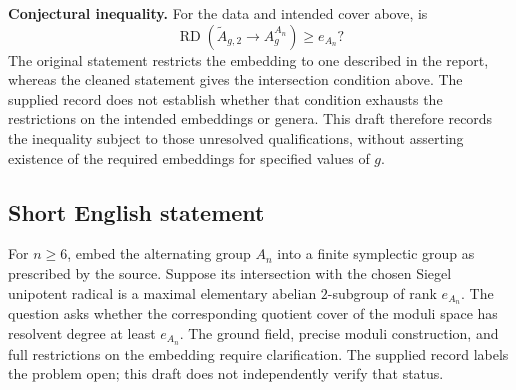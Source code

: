 \documentclass[11pt]{article}
\begin{document}
\textbf{Conjectural inequality.} For the data and intended cover above, is
\[
\operatorname{RD}\!\left(\widetilde A_{g,2}\longrightarrow A_g^{A_n}\right)\geq e_{A_n}?
\]
The original statement restricts the embedding to one described in the report, whereas the cleaned statement gives the intersection condition above. The supplied record does not establish whether that condition exhausts the restrictions on the intended embeddings or genera. This draft therefore records the inequality subject to those unresolved qualifications, without asserting existence of the required embeddings for specified values of \(g\).
\subsection{Short English statement}
For \(n\geq 6\), embed the alternating group \(A_n\) into a finite symplectic group as prescribed by the source. Suppose its intersection with the chosen Siegel unipotent radical is a maximal elementary abelian \(2\)-subgroup of rank \(e_{A_n}\). The question asks whether the corresponding quotient cover of the moduli space has resolvent degree at least \(e_{A_n}\). The ground field, precise moduli construction, and full restrictions on the embedding require clarification. The supplied record labels the problem open; this draft does not independently verify that status.
\end{document}
